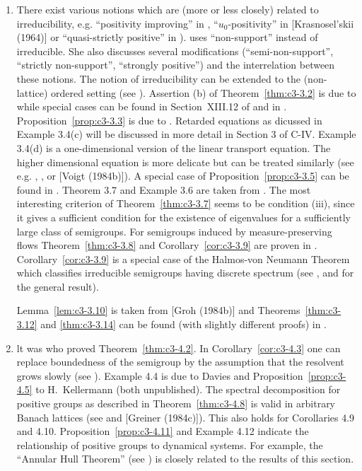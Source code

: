 \begin{enumerate}[label=\emph{Section \arabic*:}, wide]
\item
There exist various notions which are (more or less closely) related to irreducibility, e.g. \enquote{positivity improving} in \citet{reedsimon:1979}, \enquote{$u_0$-positivity} in [Krasnosel'skii (1964)] or \enquote{quasi-strictly positive} in \citet{karlin:1959}). \citet{sawashima:1964} uses \enquote{non-support} instead of irreducible. 
She also discusses several modifications (\enquote{semi-non-support}, \enquote{strictly non-support}, \enquote{strongly positive}) and the interrelation between these notions. 
The notion of irreducibility can be extended to the (non-lattice) ordered setting (see \citet{battyrobinson:1984}). 
Assertion (b) of Theorem~\ref{thm:c3-3.2} is due to \citet{majewskirobinson:1983} while special cases can be found in Section~XIII.12 of \citet{reedsimon:1979} and in \citet{kishimotorobinson:1981}. 
Proposition~\ref{prop:c3-3.3} is due to \citet{voigt:1984}. 
Retarded equations as dicussed in Example 3.4(c) will be discussed in more detail in Section 3 of C-IV. Example 3.4(d) is a one-dimensional version of the linear transport equation. 
The higher dimensional equation is more delicate but can be treated similarly (see e.g. \citet{greiner:1984}, \citet{kaperlekkerkerkerhejtmanek:1983}, or [Voigt (1984b)]). 
A special case of Proposition~\ref{prop:c3-3.5} can be found
%
in \citet{davies:1980}. 
Theorem 3.7 and Example 3.6 are taken from \citet{schaefer:1985}. 
The most interesting criterion of Theorem~\ref{thm:c3-3.7} seems to be condition (iii), since it gives a sufficient condition for the existence of eigenvalues for a sufficiently large class of semigroups. 
For semigroups induced by measure-preserving flows Theorem~\ref{thm:c3-3.8} and Corollary~\ref{cor:c3-3.9} are proven in \citet{cornfeldfominsinai:1982}. 
Corollary~\ref{cor:c3-3.9} is a special case of the Halmos-von Neumann Theorem which classifies irreducible semigroups having discrete spectrum (see \citet{cornfeldfominsinai:1982}, \citet{greiner:1982} and \citet{schaefer:1974} for the general result). 

Lemma~\ref{lem:c3-3.10} is taken from [Groh (1984b)] and Theorems~\ref{thm:c3-3.12} and \ref{thm:c3-3.14} can be found (with slightly different proofs) in \citet{greiner:1981}. 

\item 
lt was \citet{derndinger:1980} who proved Theorem~\ref{thm:c3-4.2}. 
In Corollary~\ref{cor:c3-4.3} one can replace boundedness of the semigroup by the assumption that the resolvent grows slowly (see \citet{greiner:1982}). 
Example 4.4 is due to Davies and Proposition~\ref{prop:c3-4.5} to H.~Kellermann (both unpublished). 
The spectral decomposition for positive groups as described in Theorem~\ref{thm:c3-4.8} is valid in arbitrary Banach lattices (see \citet{arendt:1982} and [Greiner (1984c)]). 
This also holds for Corollaries 4.9 and 4.10. 
Proposition~\ref{prop:c3-4.11} and Example 4.12 indicate the relationship of positive groups to dynamical systems. 
For example, the \enquote{Annular Hull Theorem} (see \citet{chiconeswanson:1981}) is closely related to the results of this section.
\end{enumerate}

\endinput
